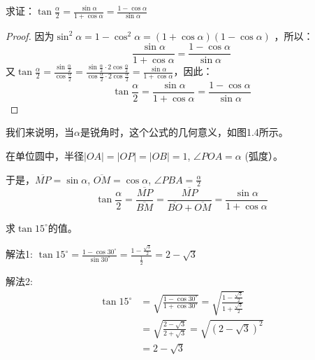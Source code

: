 \begin{example}
    求证：$\tan\frac{\alpha}{2}=\frac{\sin\alpha}{1+\cos\alpha}=\frac{1-\cos\alpha}{\sin\alpha}$
\end{example}
    
\begin{proof}
因为$\sin^2\alpha=1-\cos^2\alpha=(1+\cos \alpha)(1-\cos\alpha)$
，所以：
\[\frac{\sin\alpha}{1+\cos\alpha}=\frac{1-\cos\alpha}{\sin\alpha}\]
又$\tan\frac{\alpha}{2}=\frac{\sin\frac{\alpha}{2}}{\cos \frac{\alpha}{2}}=\frac{\sin\frac{\alpha}{2}\cdot 2\cos \frac{\alpha}{2}}{\cos\frac{\alpha}{2}\cdot 2\cos\frac{\alpha}{2}}=\frac{\sin\alpha}{1+\cos\alpha}$，因此：
\begin{equation}
    \tan\frac{\alpha}{2}=\frac{\sin\alpha}{1+\cos\alpha}=\frac{1-\cos\alpha}{\sin\alpha}
\end{equation}
\end{proof}

我们来说明，当$\alpha$是锐角时，这个公式的几何意义，如图1.4所示。
\begin{figure}[htp]
    \centering
{}
    \caption{}
\end{figure}



在单位圆中，半径$|OA| = |OP| =|OB| =1$, $\angle POA=\alpha$ (弧度）。

于是，$\overline{MP}=\sin\alpha$, $\overline{OM}=\cos\alpha$, $\angle PBA=\frac{\alpha}{2}$
\[\tan\frac{\alpha}{2}=\frac{\overline{MP}}{\overline{BM}}=\frac{\overline{MP}}{\overline{BO}+\overline{OM}}=\frac{\sin\alpha}{1+\cos\alpha}\]

\begin{example}
求$\tan 15^{\circ}$的值。
\end{example}

\begin{solution}
解法1: $\tan 15^{\circ}=\frac{1-\cos30^{\circ}}{\sin 30^{\circ}}=\frac{1-\frac{\sqrt{3}}{2}}{\frac{1}{2}}=2-\sqrt{3}$

解法2: 
\[\begin{split}
  \tan 15^{\circ}&=\sqrt{\frac{1-\cos 30^{\circ}}{1+\cos 30^{\circ}}}=\sqrt{\frac{1-\frac{\sqrt{3}}{2}}{1+\frac{\sqrt{3}}{2}}}\\  
&=\sqrt{\frac{2-\sqrt{3}}{2+\sqrt{3}}}=\sqrt{(2-\sqrt{3})^2}\\
&=2-\sqrt{3}
\end{split}\]    
\end{solution}

